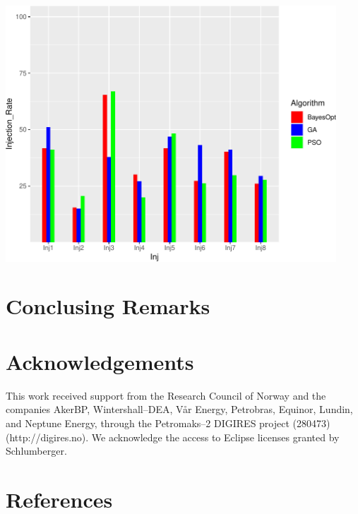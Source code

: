 \documentclass[]{elsarticle} %
\begin{document}
\begin{center}\includegraphics[width=468px]{0_Paper1_main_files/figure-latex/unnamed-chunk-12-1} \end{center}

\newpage

\hypertarget{conclusing-remarks}{%
\section{Conclusing Remarks}\label{conclusing-remarks}}

\newpage

\hypertarget{acknowledgements}{%
\section{Acknowledgements}\label{acknowledgements}}

This work received support from the Research Council of Norway and the companies AkerBP, Wintershall--DEA, Vår Energy, Petrobras, Equinor, Lundin, and Neptune Energy, through the Petromaks--2 DIGIRES project (280473) (http://digires.no). We acknowledge the access to Eclipse licenses granted by Schlumberger.

\newpage

\hypertarget{references}{%
\section*{References}\label{references}}
\end{document}
